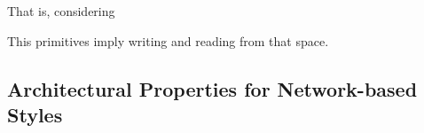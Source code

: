 That is, considering

This primitives imply writing and reading from that space.



















\subsection{Architectural Properties for Network-based Styles}
\label{sec:network_properties}




